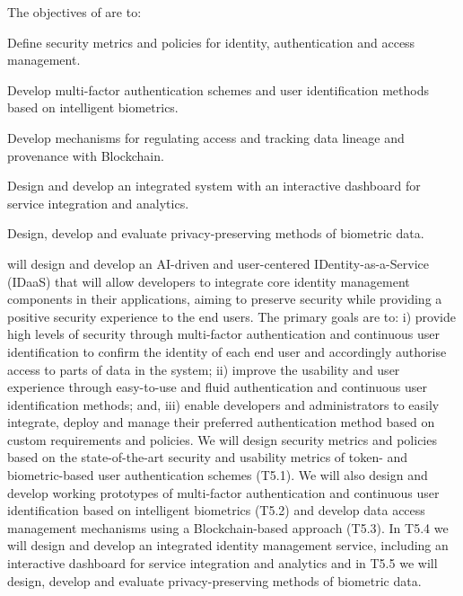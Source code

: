 \addtocounter{wpno}{1}
\begin{Workpackage}{\thewpno}
\WPTitle{\wpname{\thewpno}}

\begin{WPObjectives}
The objectives of \theWP{} are to:
\begin{compactitem}
\item Define security metrics and policies for identity, authentication and access management.
\item Develop multi-factor authentication schemes and %
user identification methods based on intelligent biometrics.
\item Develop mechanisms for regulating access and tracking data lineage and provenance with Blockchain.
\item Design and develop an integrated system with an interactive dashboard for service integration and analytics.
\item Design, develop and evaluate privacy-preserving methods of biometric data.
\end{compactitem}
\end{WPObjectives}

\begin{WPDescription}
\theWP{} will design and develop an AI-driven and user-centered IDentity-as-a-Service (IDaaS) that will allow developers to integrate core identity management components in their applications, aiming to preserve security while providing a positive security experience to the end users. The primary goals are to: i) provide high levels of security through multi-factor authentication and continuous user identification to confirm the identity of each end user and accordingly authorise access to parts of data in the system; ii) improve the usability and user experience through easy-to-use and fluid authentication and continuous user identification methods; and, iii) enable developers and administrators to easily integrate, deploy and manage their preferred authentication method based on custom requirements and policies. We will design security metrics and policies based on the state-of-the-art security and usability metrics of token- and biometric-based user authentication schemes (T5.1). We will also design and develop working prototypes of multi-factor authentication and continuous user identification based on intelligent biometrics (T5.2) and develop data access management mechanisms using a Blockchain-based approach (T5.3). In T5.4 we will design and develop an integrated identity management service, including an interactive dashboard for service integration and analytics and in T5.5 we will design, develop and evaluate privacy-preserving methods of biometric data.


\end{WPDescription}
\end{Workpackage}
